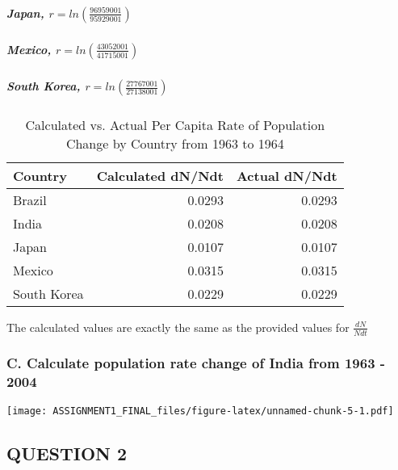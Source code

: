 \documentclass[]{article}
\let\oldsubparagraph\subparagraph
\renewcommand{\subparagraph}[1]{\oldsubparagraph{#1}\mbox{}}
\begin{document}
\subparagraph{\texorpdfstring{Japan,
\(r= ln\left(\frac{96959001}{95929001}\right)\)}{Japan, r= ln\textbackslash{}left(\textbackslash{}frac\{96959001\}\{95929001\}\textbackslash{}right)}}\label{japan-r-lnleftfrac9695900195929001right}

\subparagraph{\texorpdfstring{Mexico,
\(r= ln\left(\frac{43052001}{41715001}\right)\)}{Mexico, r= ln\textbackslash{}left(\textbackslash{}frac\{43052001\}\{41715001\}\textbackslash{}right)}}\label{mexico-r-lnleftfrac4305200141715001right}

\subparagraph{\texorpdfstring{South Korea,
\(r= ln\left(\frac{27767001}{27138001}\right)\)}{South Korea, r= ln\textbackslash{}left(\textbackslash{}frac\{27767001\}\{27138001\}\textbackslash{}right)}}\label{south-korea-r-lnleftfrac2776700127138001right}

\begin{table}

\caption{\label{tab:unnamed-chunk-4}Calculated vs. Actual Per Capita Rate of Population Change by Country from 1963 to 1964}
\centering
\begin{tabular}[t]{l|r|r}
\hline
Country & Calculated dN/Ndt & Actual dN/Ndt\\
\hline
Brazil & 0.0293 & 0.0293\\
\hline
India & 0.0208 & 0.0208\\
\hline
Japan & 0.0107 & 0.0107\\
\hline
Mexico & 0.0315 & 0.0315\\
\hline
South Korea & 0.0229 & 0.0229\\
\hline
\end{tabular}
\end{table}

The calculated values are exactly the same as the provided values for
\(\frac{dN}{Ndt}\)

\subsubsection{C. Calculate population rate change of India from 1963 -
2004}\label{c.-calculate-population-rate-change-of-india-from-1963---2004}

\texttt{[image: ASSIGNMENT1\_FINAL\_files/figure-latex/unnamed-chunk-5-1.pdf]}

\subsection{QUESTION 2}\label{question-2}
\end{document}

